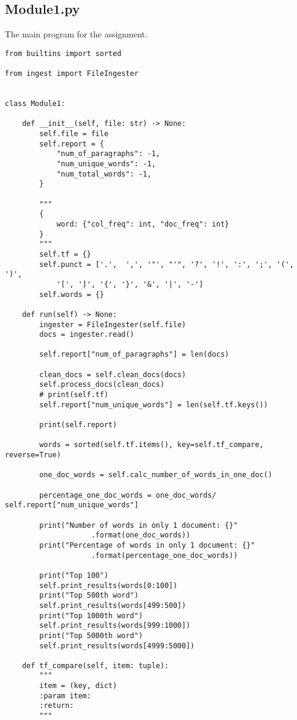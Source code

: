 \documentclass{article}
\begin{document}
\subsection{Module1.py}
The main program for the assignment. 
\begin{verbatim}
from builtins import sorted

from ingest import FileIngester


class Module1:

    def __init__(self, file: str) -> None:
        self.file = file
        self.report = {
            "num_of_paragraphs": -1,
            "num_unique_words": -1,
            "num_total_words": -1,
        }

        """
        {
            word: {"col_freq": int, "doc_freq": int}
        }
        """
        self.tf = {}
        self.punct = ['.',  ',', '"', "'", '?', '!', ':', ';', '(', ')',
            '[', ']', '{', '}', '&', '|', '-']
        self.words = {}

    def run(self) -> None:
        ingester = FileIngester(self.file)
        docs = ingester.read()

        self.report["num_of_paragraphs"] = len(docs)

        clean_docs = self.clean_docs(docs)
        self.process_docs(clean_docs)
        # print(self.tf)
        self.report["num_unique_words"] = len(self.tf.keys())

        print(self.report)

        words = sorted(self.tf.items(), key=self.tf_compare, reverse=True)

        one_doc_words = self.calc_number_of_words_in_one_doc()

        percentage_one_doc_words = one_doc_words/ self.report["num_unique_words"]

        print("Number of words in only 1 document: {}"
                    .format(one_doc_words))
        print("Percentage of words in only 1 document: {}"
                    .format(percentage_one_doc_words))

        print("Top 100")
        self.print_results(words[0:100])
        print("Top 500th word")
        self.print_results(words[499:500])
        print("Top 1000th word")
        self.print_results(words[999:1000])
        print("Top 5000th word")
        self.print_results(words[4999:5000])

    def tf_compare(self, item: tuple):
        """
        item = (key, dict)
        :param item:
        :return:
        """


\end{verbatim}
\end{document}
